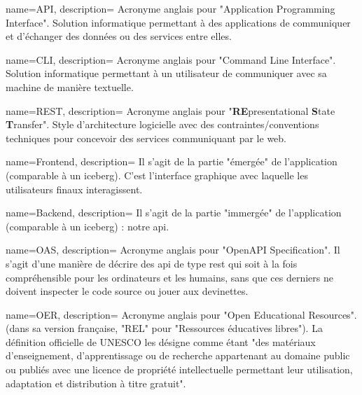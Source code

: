 



{
    name={API},
    description={
        Acronyme anglais pour "Application Programming Interface".
        Solution informatique permettant à des applications de communiquer et d'échanger des données ou des services entre elles.
    }
}

{
    name={CLI},
    description={
        Acronyme anglais pour "Command Line Interface".
        Solution informatique permettant à un utilisateur de communiquer avec sa machine de manière textuelle.
    }
}

{
    name={REST},
    description={
        Acronyme anglais pour "\textbf{RE}presentational \textbf{S}tate \textbf{T}ransfer".
        Style d'architecture logicielle avec des contraintes/conventions techniques pour concevoir des services communiquant par le web.
    }
}

{
    name={Frontend},
    description={
        Il s'agit de la partie "émergée" de l'application (comparable à un iceberg). C'est l'interface graphique avec laquelle les utilisateurs finaux interagissent.  
    }
}

{
    name={Backend},
    description={
        Il s'agit de la partie "immergée" de l'application (comparable à un iceberg) : notre \Gls{api}.
    }
}

{
    name={OAS},
    description={
        Acronyme anglais pour "OpenAPI Specification".
        Il s'agit d'une manière de décrire des \Gls{api} de type \Gls{rest} qui soit à la fois compréhensible pour les ordinateurs et les humains, sans que ces derniers ne doivent inspecter le code source ou jouer aux devinettes.
    }
}

{
    name={OER},
    description={
        Acronyme anglais pour "Open Educational Resources". (dans sa version française, "REL" pour "Ressources éducatives libres").
        La définition officielle de UNESCO\cite{UNESCO} les désigne comme étant "des matériaux d’enseignement, d'apprentissage ou de recherche appartenant au domaine public ou publiés avec une licence de propriété intellectuelle permettant leur utilisation, adaptation et distribution à titre gratuit".
    }
}

